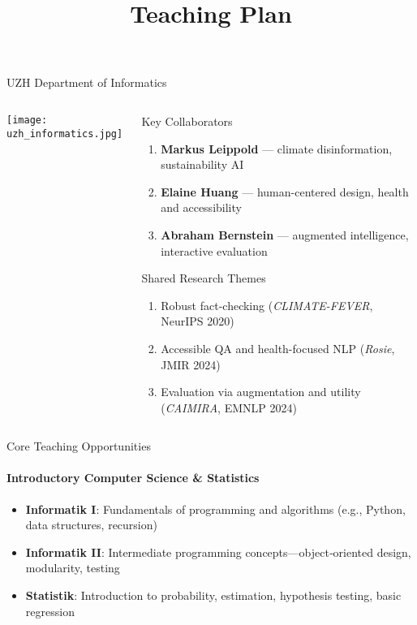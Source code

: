 \documentclass[compress]{beamer}
\begin{document}
\begin{frame}{UZH Department of Informatics}
\begin{columns}
  \begin{column}{0.45\textwidth}
    \texttt{[image: uzh\_informatics.jpg]} %
  \end{column}
  \begin{column}{0.5\textwidth}
    \begin{block}{Key Collaborators}
      \begin{enumerate}
        \item \textbf{Markus Leippold} — climate disinformation, sustainability AI  
        \item \textbf{Elaine Huang} — human-centered design, health and accessibility  
        \item \textbf{Abraham Bernstein} — augmented intelligence, interactive evaluation
      \end{enumerate}
    \end{block}

    \begin{block}{Shared Research Themes}
      \begin{enumerate}
        \item Robust fact-checking (\textit{CLIMATE-FEVER}, NeurIPS 2020)  
        \item Accessible QA and health-focused NLP (\textit{Rosie}, JMIR 2024)  
        \item Evaluation via augmentation and utility (\textit{CAIMIRA}, EMNLP 2024)
      \end{enumerate}
    \end{block}
  \end{column}
\end{columns}
\end{frame}



\title[]{Teaching Plan}


\frame{
\titlepage
\tiny
}


\begin{frame}{Core Teaching Opportunities}
\framesubtitle{Introductory Computer Science \& Statistics}
\begin{itemize}
  \item \textbf{Informatik I}:  
        Fundamentals of programming and algorithms (e.g., Python, data structures, recursion)
  \item \textbf{Informatik II}:  
        Intermediate programming concepts—object‑oriented design, modularity, testing
  \item \textbf{Statistik}:  
        Introduction to probability, estimation, hypothesis testing, basic regression
\end{itemize}
\end{frame}
\end{document}
